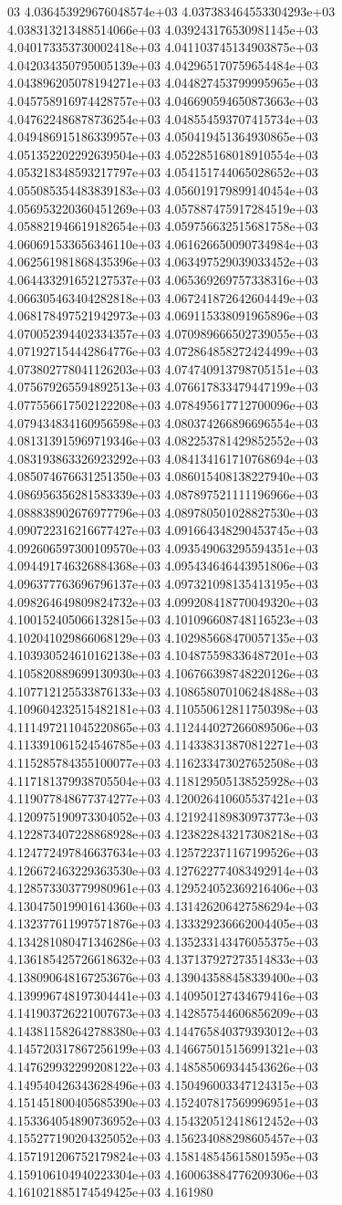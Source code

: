 03	4.036453929676048574e+03	4.037383464553304293e+03	4.038313213488514066e+03	4.039243176530981145e+03	4.040173353730002418e+03	4.041103745134903875e+03	4.042034350795005139e+03	4.042965170759654484e+03	4.043896205078194271e+03	4.044827453799995965e+03	4.045758916974428757e+03	4.046690594650873663e+03	4.047622486878736254e+03	4.048554593707415734e+03	4.049486915186339957e+03	4.050419451364930865e+03	4.051352202292639504e+03	4.052285168018910554e+03	4.053218348593217797e+03	4.054151744065028652e+03	4.055085354483839183e+03	4.056019179899140454e+03	4.056953220360451269e+03	4.057887475917284519e+03	4.058821946619182654e+03	4.059756632515681758e+03	4.060691533656346110e+03	4.061626650090734984e+03	4.062561981868435396e+03	4.063497529039033452e+03	4.064433291652127537e+03	4.065369269757338316e+03	4.066305463404282818e+03	4.067241872642604449e+03	4.068178497521942973e+03	4.069115338091965896e+03	4.070052394402334357e+03	4.070989666502739055e+03	4.071927154442864776e+03	4.072864858272424499e+03	4.073802778041126203e+03	4.074740913798705151e+03	4.075679265594892513e+03	4.076617833479447199e+03	4.077556617502122208e+03	4.078495617712700096e+03	4.079434834160956598e+03	4.080374266896696554e+03	4.081313915969719346e+03	4.082253781429852552e+03	4.083193863326923292e+03	4.084134161710768694e+03	4.085074676631251350e+03	4.086015408138227940e+03	4.086956356281583339e+03	4.087897521111196966e+03	4.088838902676977796e+03	4.089780501028827530e+03	4.090722316216677427e+03	4.091664348290453745e+03	4.092606597300109570e+03	4.093549063295594351e+03	4.094491746326884368e+03	4.095434646443951806e+03	4.096377763696796137e+03	4.097321098135413195e+03	4.098264649809824732e+03	4.099208418770049320e+03	4.100152405066132815e+03	4.101096608748116523e+03	4.102041029866068129e+03	4.102985668470057135e+03	4.103930524610162138e+03	4.104875598336487201e+03	4.105820889699130930e+03	4.106766398748220126e+03	4.107712125533876133e+03	4.108658070106248488e+03	4.109604232515482181e+03	4.110550612811750398e+03	4.111497211045220865e+03	4.112444027266089506e+03	4.113391061524546785e+03	4.114338313870812271e+03	4.115285784355100077e+03	4.116233473027652508e+03	4.117181379938705504e+03	4.118129505138525928e+03	4.119077848677374277e+03	4.120026410605537421e+03	4.120975190973304052e+03	4.121924189830973773e+03	4.122873407228868928e+03	4.123822843217308218e+03	4.124772497846637634e+03	4.125722371167199526e+03	4.126672463229363530e+03	4.127622774083492914e+03	4.128573303779980961e+03	4.129524052369216406e+03	4.130475019901614360e+03	4.131426206427586294e+03	4.132377611997571876e+03	4.133329236662004405e+03	4.134281080471346286e+03	4.135233143476055375e+03	4.136185425726618632e+03	4.137137927273514833e+03	4.138090648167253676e+03	4.139043588458339400e+03	4.139996748197304441e+03	4.140950127434679416e+03	4.141903726221007673e+03	4.142857544606856209e+03	4.143811582642788380e+03	4.144765840379393012e+03	4.145720317867256199e+03	4.146675015156991321e+03	4.147629932299208122e+03	4.148585069344543626e+03	4.149540426343628496e+03	4.150496003347124315e+03	4.151451800405685390e+03	4.152407817569996951e+03	4.153364054890736952e+03	4.154320512418612452e+03	4.155277190204325052e+03	4.156234088298605457e+03	4.157191206752179824e+03	4.158148545615801595e+03	4.159106104940223304e+03	4.160063884776209306e+03	4.161021885174549425e+03	4.161980